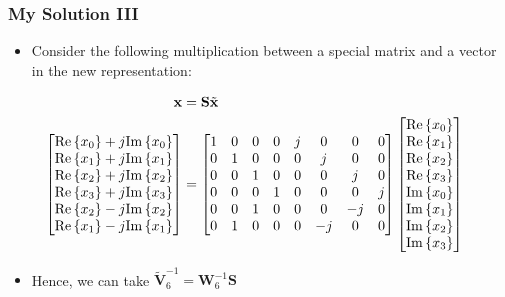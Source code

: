 \documentclass{beamer}
\begin{document}
\begin{frame}
\frametitle{My Solution III}
\begin{itemize}
    \item Consider the following multiplication between a special matrix and a vector in the new representation:
    
    \begin{align*}
        \mathbf{x} &= \mathbf{S}\tilde{\mathbf{x}} \\
        \hspace{-25pt}
        \begin{bmatrix}
            \mathrm{Re}\left\{x_0\right\} + j\mathrm{Im}\left\{x_0\right\} \\
            \mathrm{Re}\left\{x_1\right\} + j\mathrm{Im}\left\{x_1\right\} \\
            \mathrm{Re}\left\{x_2\right\} + j\mathrm{Im}\left\{x_2\right\} \\
            \mathrm{Re}\left\{x_3\right\} + j\mathrm{Im}\left\{x_3\right\} \\
            \mathrm{Re}\left\{x_2\right\} - j\mathrm{Im}\left\{x_2\right\} \\
            \mathrm{Re}\left\{x_1\right\} - j\mathrm{Im}\left\{x_1\right\} 
        \end{bmatrix}
        &=
        \begin{bmatrix}
            1 & 0 & 0 & 0 & j & 0 & 0 & 0 \\ 
            0 & 1 & 0 & 0 & 0 & j & 0 & 0 \\ 
            0 & 0 & 1 & 0 & 0 & 0 & j & 0 \\ 
            0 & 0 & 0 & 1 & 0 & 0 & 0 & j \\ 
            0 & 0 & 1 & 0 & 0 & 0 & -j & 0 \\ 
            0 & 1 & 0 & 0 & 0 & -j & 0 & 0  
        \end{bmatrix}
        \begin{bmatrix}
            \mathrm{Re}\left\{x_0\right\} \\
            \mathrm{Re}\left\{x_1\right\} \\
            \mathrm{Re}\left\{x_2\right\} \\
            \mathrm{Re}\left\{x_3\right\} \\
            \mathrm{Im}\left\{x_0\right\} \\
            \mathrm{Im}\left\{x_1\right\} \\
            \mathrm{Im}\left\{x_2\right\} \\
            \mathrm{Im}\left\{x_3\right\} 
        \end{bmatrix}
    \end{align*}
    \item Hence, we can take $\tilde{\mathbf{V}}^{-1}_6 = \mathbf{W}^{-1}_6\mathbf{S}$
\end{itemize}
\end{frame}
\end{document}

